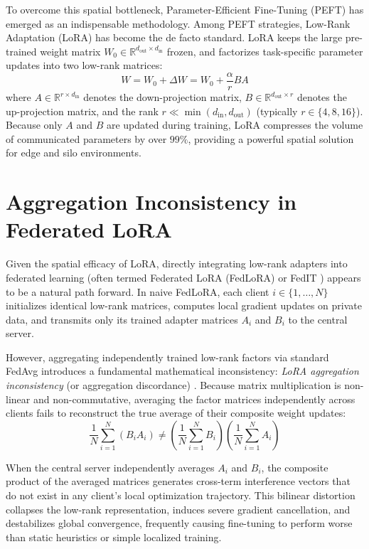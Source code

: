 To overcome this spatial bottleneck, Parameter-Efficient Fine-Tuning (PEFT) has emerged as an indispensable methodology. Among PEFT strategies, Low-Rank Adaptation (LoRA) \cite{hu2022lora} has become the de facto standard. LoRA keeps the large pre-trained weight matrix $W_0 \in \mathbb{R}^{d_{\text{out}} \times d_{\text{in}}}$ frozen, and factorizes task-specific parameter updates into two low-rank matrices:
\begin{equation}
    W = W_0 + \Delta W = W_0 + \frac{\alpha}{r} B A
    \label{eq:intro_lora_decomposition}
\end{equation}
where $A \in \mathbb{R}^{r \times d_{\text{in}}}$ denotes the down-projection matrix, $B \in \mathbb{R}^{d_{\text{out}} \times r}$ denotes the up-projection matrix, and the rank $r \ll \min(d_{\text{in}}, d_{\text{out}})$ (typically $r \in \{4, 8, 16\}$). Because only $A$ and $B$ are updated during training, LoRA compresses the volume of communicated parameters by over $99\%$, providing a powerful spatial solution for edge and silo environments.

\section{Aggregation Inconsistency in Federated LoRA}
\label{sec:intro-inconsistency}
Given the spatial efficacy of LoRA, directly integrating low-rank adapters into federated learning (often termed Federated LoRA (FedLoRA) or FedIT \cite{yang2025federated, zhang2023towards}) appears to be a natural path forward. In naive FedLoRA, each client $i \in \{1, \dots, N\}$ initializes identical low-rank matrices, computes local gradient updates on private data, and transmits only its trained adapter matrices $A_i$ and $B_i$ to the central server.

However, aggregating independently trained low-rank factors via standard FedAvg introduces a fundamental mathematical inconsistency: \emph{LoRA aggregation inconsistency} (or aggregation discordance) \cite{yang2025federated}. Because matrix multiplication is non-linear and non-commutative, averaging the factor matrices independently across clients fails to reconstruct the true average of their composite weight updates:
\begin{equation}
    \frac{1}{N}\sum_{i=1}^{N} (B_i A_i) \neq \left(\frac{1}{N}\sum_{i=1}^{N} B_i\right)\left(\frac{1}{N}\sum_{i=1}^{N} A_i\right)
    \label{eq:intro_inconsistency}
\end{equation}

When the central server independently averages $A_i$ and $B_i$, the composite product of the averaged matrices generates cross-term interference vectors that do not exist in any client's local optimization trajectory. This bilinear distortion collapses the low-rank representation, induces severe gradient cancellation, and destabilizes global convergence, frequently causing fine-tuning to perform worse than static heuristics or simple localized training.

